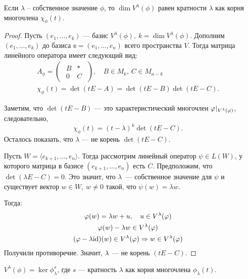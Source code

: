 \begin{Suggestion}
	Если $\lambda$ -- собственное значение $\phi$, то $\dim{V^{\lambda}(\phi)}$ равен кратности 
	$\lambda$ как корня многочлена $\chi_\phi(t)$.
\end{Suggestion}

\begin{proof}
	Пусть $(e_1, \ldots, e_k)$ --- базис $V^{\lambda}(\phi),\ k = \dim{V^{\lambda}(\phi)}$. Дополним $(e_1, \ldots, e_k)$  до базиса $\mathbb{e} = (e_1, \ldots, e_n)$ всего пространства $V$. Тогда матрица линейного оператора имеет следующий вид:
	\begin{gather*}
	A_\phi = 
		\begin{pmatrix}
		\begin{array}{c|c}
		B & * \\ \hline
		0 & C
		\end{array}
		\end{pmatrix},\quad B \in M_k,\ C \in M_{n-k} \\
		\chi_\phi(t) = \det(tE - A) = \det(tE - B)\det(tE - C).
	\end{gather*}
	
	Заметим, что $\det(tE - B)$ --- это характеристический многочлен ${\varphi}\negmedspace\mid_{V^\lambda(\varphi)}$, следовательно, 
	$$
	\chi_\phi(t) = (t - \lambda)^k\det(tE - C).
	$$
	Осталось показать, что $\lambda$ --- не корень $\det(tE - C)$.
	
	Пусть $W = \langle e_{k+1}, \ldots, e_n \rangle$. Тогда рассмотрим линейный оператор $\psi \in L(W)$, у которого матрица в базисе $(e_{k+1}, \ldots, e_n)$ есть $C$. Предположим, что $\det(\lambda E - C) = 0.$ Это значит, что $\lambda$~--- собственное 	значение для $\psi$ и существует вектор $w \in W,\ w \neq 0$ такой, что $\psi(w) = \lambda w$.
	
	Тогда:
	\begin{gather*}
	\varphi(w) = \lambda w + u, \quad u \in V^\lambda(\varphi) \\
	\varphi(w) - \lambda w \in V^\lambda(\varphi) \\
	(\varphi - \lambda\mathrm{id})(w) \in V^\lambda(\varphi) \Rightarrow w \in V^\lambda(\varphi)
	\end{gather*}
	Получили противоречие. Значит, $\lambda$ --- не корень $(tE - C)$.
\end{proof}

\begin{Consequence}
	$V^{\lambda}(\phi) = \ker\phi^s_\lambda$, где $s$ --- кратность $\lambda$ как корня многочлена $\phi_\lambda(t)$.
\end{Consequence}

